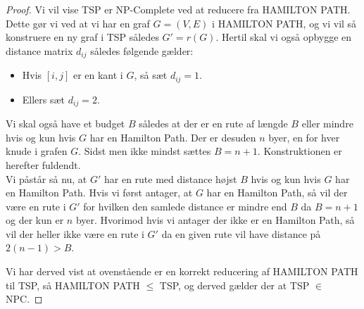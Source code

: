\begin{proof}
 Vi vil vise TSP er NP-Complete ved at reducere fra HAMILTON PATH. Dette gør vi ved at vi har en graf $G=(V,E)$ i HAMILTON PATH, og vi vil så konstruere en ny graf i TSP således $G' = r(G)$. Hertil skal vi også opbygge en distance matrix $d_{ij}$ således følgende gælder:
\begin{itemize}
 \item Hvis $[i,j]$ er en kant i $G$, så sæt $d_{ij}=1$.
 \item Ellers sæt $d_{ij}=2$.
\end{itemize}
Vi skal også have et budget $B$ således at der er en rute af længde $B$ eller mindre hvis og kun hvis $G$ har en Hamilton Path. Der er desuden $n$ byer, en for hver knude i grafen $G$. Sidst men ikke mindst sættes $B=n+1$. Konstruktionen er herefter fuldendt.\\

Vi påstår så nu, at $G'$ har en rute med distance højst $B$ hvis og kun hvis $G$ har en Hamilton Path. Hvis vi først antager, at $G$ har en Hamilton Path, så vil der være en rute i $G'$ for hvilken den samlede distance er mindre end $B$ da $B=n+1$ og der kun er $n$ byer. Hvorimod hvis vi antager der ikke er en Hamilton Path, så vil der heller ikke være en rute i $G'$ da en given rute vil have distance på $2(n-1) > B$.

Vi har derved vist at ovenstående er en korrekt reducering af HAMILTON PATH til TSP, så HAMILTON PATH $\leq$ TSP, og derved gælder der at TSP $\in$ NPC.
\end{proof}